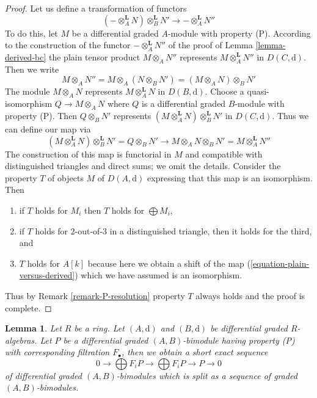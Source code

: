 \documentclass{stacks-project}
\theoremstyle{plain}
\newtheorem{lemma}[subsection]{Lemma}
\theoremstyle{definition}
\theoremstyle{remark}
\numberwithin{equation}{subsection}
\begin{document}
\begin{proof}
Let us define a transformation of functors
$$
(- \otimes_A^\mathbf{L} N) \otimes_B^\mathbf{L} N'
\longrightarrow
- \otimes_A^\mathbf{L} N''
$$
To do this, let
$M$ be a differential graded $A$-module with property (P).
According to the construction of the functor $- \otimes_A^\mathbf{L} N''$
of the proof of Lemma \ref{lemma-derived-bc} the plain tensor
product $M \otimes_A N''$ represents $M \otimes_A^\mathbf{L} N''$
in $D(C, \text{d})$. Then we write
$$
M \otimes_A N'' =
M \otimes_A (N \otimes_B N') =
(M \otimes_A N) \otimes_B N'
$$
The module $M \otimes_A N$ represents $M \otimes_A^\mathbf{L} N$
in $D(B, \text{d})$. Choose a quasi-isomorphism $Q \to M \otimes_A N$
where $Q$ is a differential graded $B$-module with property (P). Then
$Q \otimes_B N'$ represents
$(M \otimes_A^\mathbf{L} N) \otimes_B^\mathbf{L} N'$ in
$D(C, \text{d})$.
Thus we can define our map via
$$
(M \otimes_A^\mathbf{L} N) \otimes_B^\mathbf{L} N' =
Q \otimes_B N' \to
M \otimes_A N \otimes_B N' =
M \otimes_A^\mathbf{L} N''
$$
The construction of this map is functorial in $M$ and compatible
with distinguished triangles and direct sums; we omit the details.
Consider the property $T$ of objects $M$ of $D(A, \text{d})$ 
expressing that this map is an isomorphism. Then
\begin{enumerate}
\item if $T$ holds for $M_i$ then $T$ holds for $\bigoplus M_i$,
\item if $T$ holds for $2$-out-of-$3$ in a distinguished
triangle, then it holds for the third, and
\item $T$ holds for $A[k]$ because here we obtain a shift
of the map (\ref{equation-plain-versus-derived}) which we
have assumed is an isomorphism.
\end{enumerate}
Thus by Remark \ref{remark-P-resolution} property $T$
always holds and the proof is complete.
\end{proof}

\begin{lemma}
\label{lemma-bimodule-property-P-sequence}
Let $R$ be a ring. Let $(A, \text{d})$ and $(B, \text{d})$ be
differential graded $R$-algebras. Let $P$ be a
differential graded $(A, B)$-bimodule having property (P)
with corresponding filtration $F_\bullet$, then we obtain a
short exact sequence
$$
0 \to
\bigoplus\nolimits F_iP \to
\bigoplus\nolimits F_iP \to P \to 0
$$
of differential graded $(A, B)$-bimodules which is split as a sequence
of graded $(A, B)$-bimodules.
\end{lemma}
\end{document}

